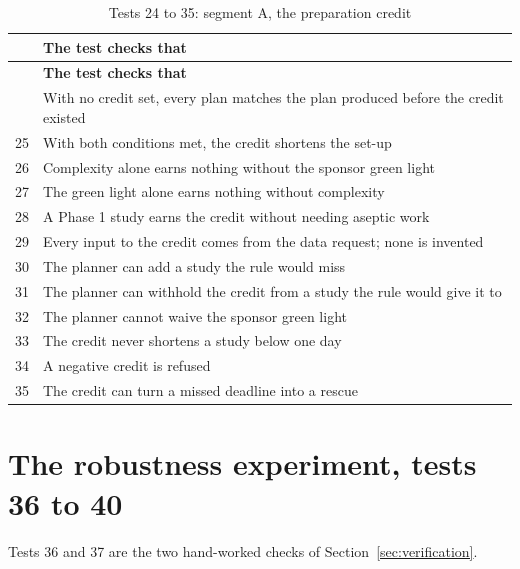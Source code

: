 \begin{longtable}{@{}rp{}@{}}
  \caption{Tests 24 to 35: segment A, the preparation credit}
  \label{tab:tests4}\\
  \toprule
  & \textbf{The test checks that} \\
  \midrule
  \endfirsthead
  \toprule
  & \textbf{The test checks that} \\
  \midrule
  \endhead
  \bottomrule
  \endfoot
  24 & With no credit set, every plan matches the plan produced before the credit existed \\
  25 & With both conditions met, the credit shortens the set-up \\
  26 & Complexity alone earns nothing without the sponsor green light \\
  27 & The green light alone earns nothing without complexity \\
  28 & A Phase 1 study earns the credit without needing aseptic work \\
  29 & Every input to the credit comes from the data request; none is invented \\
  30 & The planner can add a study the rule would miss \\
  31 & The planner can withhold the credit from a study the rule would give it to \\
  32 & The planner cannot waive the sponsor green light \\
  33 & The credit never shortens a study below one day \\
  34 & A negative credit is refused \\
  35 & The credit can turn a missed deadline into a rescue \\
\end{longtable}

\section{The robustness experiment, tests 36 to 40}
\label{sec:testsrobust}

Tests 36 and 37 are the two hand-worked checks of Section~\ref{sec:verification}.

